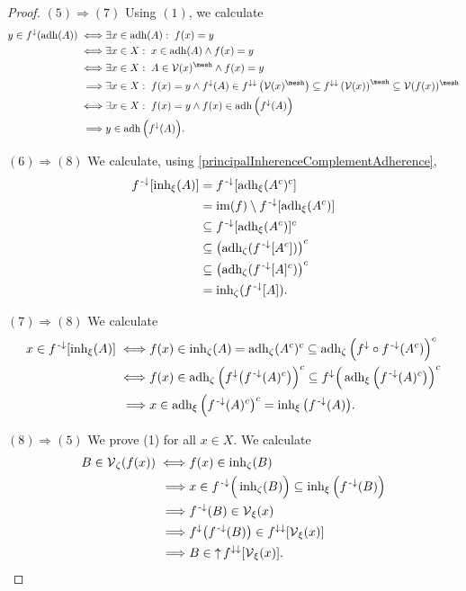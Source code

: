 \begin{proof}
$(5) \Rightarrow (7)$ Using $(1)$, we calculate
\begin{align*}
y\in f^\imf(\adh(A)) \iff& \exists x\in \adh(A):\;f(x) = y\\
\iff& \exists x\in X: \; x\in \adh(A) \land f(x) = y\\
\iff& \exists x\in X: \; A\in\vicinity(x)^{\mesh}  \land f(x) = y \\
\implies& \exists x\in X: \; f(x) = y \land f^\imf(A)\in f^{\imf\imf}\left(\vicinity(x)^{\mesh}\right) \subseteq f^{\imf\imf}\left(\vicinity(x)\right)^{\mesh} \subseteq \vicinity(f(x))^{\mesh} \\
\iff& \exists x\in X: \; f(x) = y \land f(x)\in \adh\Big(f^\imf(A)\Big) \\
\implies& y\in \adh\Big(f^\imf(A)\Big).
\end{align*}

$(6) \Rightarrow (8)$ We calculate, using \ref{principalInherenceComplementAdherence},
\begin{align*}
f^{\text{\hspace{0.15em}-}\downarrow}[\operatorname{inh}_\xi(A)] &= f^{\text{\hspace{0.15em}-}\downarrow}[\operatorname{adh}_\xi(A^c)^c] \\
&= \operatorname{im}(f)\setminus f^{{\text{\hspace{0.15em}-}\downarrow}}[\operatorname{adh}_\xi(A^c)] \\
&\subseteq f^{{\text{\hspace{0.15em}-}\downarrow}}[\operatorname{adh}_\xi(A^c)]^c \\
&\subseteq \left(\operatorname{adh}_\zeta(f^{{\text{\hspace{0.15em}-}\downarrow}}[A^c])\right)^c \\
&\subseteq \left(\operatorname{adh}_\zeta(f^{{\text{\hspace{0.15em}-}\downarrow}}[A]^c)\right)^c \\
&= \operatorname{inh}_\zeta(f^{{\text{\hspace{0.15em}-}\downarrow}}[A]).
\end{align*}

$(7) \Rightarrow (8)$ We calculate
\begin{align*}
x\in f^{\text{\hspace{0.15em}-}\downarrow}[\operatorname{inh}_\xi(A)] \iff& f(x) \in \operatorname{inh}_\zeta(A) = \operatorname{adh}_\zeta(A^c)^c \subseteq \operatorname{adh}_\zeta\Big(f^\downarrow\circ f^{{\text{\hspace{0.15em}-}\downarrow}}(A^c)\Big)^c \\
\iff& f(x) \in \operatorname{adh}_\zeta\Big(f^\downarrow\big(f^{{\text{\hspace{0.15em}-}\downarrow}}(A)^c\big)\Big)^c \subseteq f^\downarrow\Big(\operatorname{adh}_\xi\Big(f^{{\text{\hspace{0.15em}-}\downarrow}}(A)^c\big)\Big)^c \\
\implies& x\in \operatorname{adh}_\xi\Big(f^{{\text{\hspace{0.15em}-}\downarrow}}(A)^c\big)^c = \operatorname{inh}_\xi\big(f^{{\text{\hspace{0.15em}-}\downarrow}}(A)\big).
\end{align*}

$(8) \Rightarrow (5)$ We prove (1) for all $x\in X$. We calculate
\begin{align*}
B\in \operatorname{\mathcal{V}}_\zeta(f(x)) \iff& f(x) \in \operatorname{inh}_\zeta(B) \\
\implies& x\in f^{{\text{\hspace{0.15em}-}\downarrow}}\Big(\operatorname{inh}_\zeta(B)\Big) \subseteq \operatorname{inh}_\xi\Big(f^{\text{\hspace{0.15em}-}\downarrow}(B)\Big) \\
\implies& f^{\text{\hspace{0.15em}-}\downarrow}(B) \in \operatorname{\mathcal{V}}_\xi(x) \\
\implies& f^\downarrow\big(f^{\text{\hspace{0.15em}-}\downarrow}(B)\big) \in f^{\downarrow\downarrow}[\operatorname{\mathcal{V}}_\xi(x)] \\
\implies& B \in \operatorname{\uparrow} f^{\downarrow\downarrow}[\operatorname{\mathcal{V}}_\xi(x)].
\end{align*}
\end{proof}
